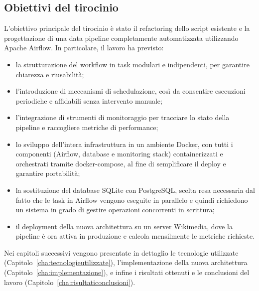 \subsection{Obiettivi del tirocinio}
\label{subsec:obiettivi_tirocinio}

L’obiettivo principale del tirocinio è stato il refactoring dello script esistente e la progettazione di una data pipeline completamente automatizzata utilizzando Apache Airflow. In particolare, il lavoro ha previsto:

\begin{itemize}
\item la strutturazione del workflow in task modulari e indipendenti, per garantire chiarezza e riusabilità;
\item l’introduzione di meccanismi di schedulazione, così da consentire esecuzioni periodiche e affidabili senza intervento manuale;
\item l’integrazione di strumenti di monitoraggio per tracciare lo stato della pipeline e raccogliere metriche di performance;
\item lo sviluppo dell’intera infrastruttura in un ambiente Docker, con tutti i componenti (Airflow, database e monitoring stack) containerizzati e orchestrati tramite docker-compose, al fine di semplificare il deploy e garantire portabilità;
\item la sostituzione del database SQLite con PostgreSQL, scelta resa necessaria dal fatto che le task in Airflow vengono eseguite in parallelo e quindi richiedono un sistema in grado di gestire operazioni concorrenti in scrittura;
\item il deployment della nuova architettura su un server Wikimedia, dove la pipeline è ora attiva in produzione e calcola mensilmente le metriche richieste.
\end{itemize}

Nei capitoli successivi vengono presentate in dettaglio le tecnologie utilizzate (Capitolo~\ref{cha:tecnologieutilizzate}), l’implementazione della nuova architettura (Capitolo~\ref{cha:implementazione}), e infine i risultati ottenuti e le conclusioni del lavoro (Capitolo~\ref{cha:risultaticonclusioni}).

\clearpage